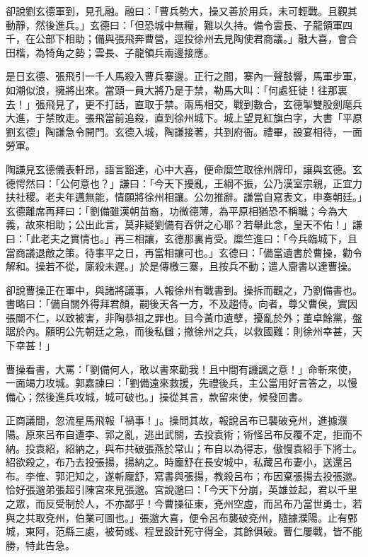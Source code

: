 卻說劉玄德軍到，見孔融。融曰：「曹兵勢大，操又善於用兵，未可輕戰。且觀其動靜，然後進兵。」玄德曰：「但恐城中無糧，難以久持。備令雲長、子龍領軍四千，在公部下相助；備與張飛奔曹營，逕投徐州去見陶使君商議。」融大喜，會合田楷，為犄角之勢；雲長、子龍領兵兩邊接應。

是日玄德、張飛引一千人馬殺入曹兵寨邊。正行之間，寨內一聲鼓響，馬軍步軍，如潮似浪，擁將出來。當頭一員大將乃是于禁，勒馬大叫：「何處狂徒！往那裏去！」張飛見了，更不打話，直取于禁。兩馬相交，戰到數合，玄德掣雙股劍麾兵大進，于禁敗走。張飛當前追殺，直到徐州城下。城上望見紅旗白字，大書「平原劉玄德」陶謙急令開門。玄德入城，陶謙接著，共到府衙。禮畢，設宴相待，一面勞軍。

陶謙見玄德儀表軒昂，語言豁達，心中大喜，便命糜竺取徐州牌印，讓與玄德。玄德愕然曰：「公何意也？」謙曰：「今天下擾亂，王綱不振，公乃漢室宗親，正宜力扶社稷。老夫年邁無能，情願將徐州相讓。公勿推辭。謙當自寫表文，申奏朝廷。」玄德離席再拜曰：「劉備雖漢朝苗裔，功微德薄，為平原相猶恐不稱職；今為大義，故來相助；公出此言，莫非疑劉備有吞併之心耶？若舉此念，皇天不佑！」謙曰：「此老夫之實情也。」再三相讓，玄德那裏肯受。糜竺進曰：「今兵臨城下，且當商議退敵之策。待事平之日，再當相讓可也。」玄德曰：「備當遺書於曹操，勸令解和。操若不從，廝殺未遲。」於是傳檄三寨，且按兵不動；遣人齎書以達曹操。

卻說曹操正在軍中，與諸將議事，人報徐州有戰書到。操拆而觀之，乃劉備書也。書略曰：「備自關外得拜君顏，嗣後天各一方，不及趨侍。向者，尊父曹侯，實因張闓不仁，以致被害，非陶恭祖之罪也。目今黃巾遺孽，擾亂於外；董卓餘黨，盤踞於內。願明公先朝廷之急，而後私讎；撤徐州之兵，以救國難：則徐州幸甚，天下幸甚！」

曹操看書，大罵：「劉備何人，敢以書來勸我！且中間有譏諷之意！」命斬來使，一面竭力攻城。郭嘉諫曰：「劉備遠來救援，先禮後兵，主公當用好言答之，以慢備心；然後進兵攻城，城可破也。」操從其言，款留來使，候發回書。

正商議間，忽流星馬飛報「禍事！」。操問其故，報說呂布已襲破兗州，進據濮陽。原來呂布自遭李、郭之亂，逃出武關，去投袁術；術怪呂布反覆不定，拒而不納。投袁紹，紹納之，與布共破張燕於常山；布自以為得志，傲慢袁紹手下將士。紹欲殺之，布乃去投張揚，揚納之。時龐舒在長安城中，私藏呂布妻小，送還呂布。李傕、郭汜知之，遂斬龐舒，寫書與張揚，教殺呂布；布因棄張揚去投張邈。恰好張邈弟張超引陳宮來見張邈。宮說邈曰：「今天下分崩，英雄並起，君以千里之眾，而反受制於人，不亦鄙乎！今曹操征東，兗州空虛，而呂布乃當世勇士，若與之共取兗州，伯業可圖也。」張邈大喜，便令呂布襲破兗州，隨據濮陽。止有鄄城，東阿，范縣三處，被荀彧、程昱設計死守得全，其餘俱破。曹仁屢戰，皆不能勝，特此告急。

